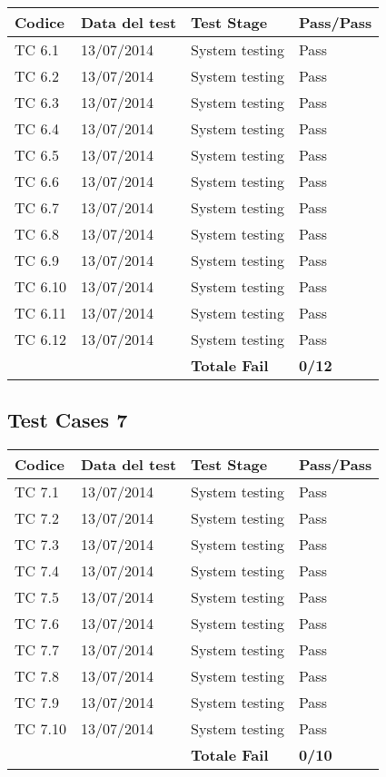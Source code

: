 \begin{tabular}{|p{3cm}|p{3cm}|p{3cm}|p{3cm}|}
	\hline
	\rowcolor{Gray}
	\textbf{Codice} & \textbf{Data del test} & \textbf{Test Stage} & \textbf{Pass/Pass}\tabularnewline
	\hline
	TC 6.1			& 13/07/2014 			& System testing		& Pass \tabularnewline
	\hline
	TC 6.2			& 13/07/2014 			& System testing		& Pass \tabularnewline
	\hline
	TC 6.3			& 13/07/2014 			& System testing		& Pass \tabularnewline
	\hline
	TC 6.4			& 13/07/2014 			& System testing		& Pass \tabularnewline
	\hline
	TC 6.5			& 13/07/2014 			& System testing		& Pass \tabularnewline
	\hline
	TC 6.6			& 13/07/2014 			& System testing		& Pass \tabularnewline
	\hline
	TC 6.7			& 13/07/2014 			& System testing		& Pass \tabularnewline
	\hline
	TC 6.8			& 13/07/2014 			& System testing		& Pass \tabularnewline
	\hline
	TC 6.9			& 13/07/2014 			& System testing		& Pass \tabularnewline
	\hline
	TC 6.10			& 13/07/2014 			& System testing		& Pass \tabularnewline
	\hline
	TC 6.11			& 13/07/2014 			& System testing		& Pass \tabularnewline
	\hline
	TC 6.12			& 13/07/2014 			& System testing		& Pass \tabularnewline
	\hline
					& 						& \textbf{Totale Fail}	& \textbf{0/12} \tabularnewline
	\hline
\end{tabular}

\subsection{Test Cases 7}

\begin{tabular}{|p{3cm}|p{3cm}|p{3cm}|p{3cm}|}
	\hline
	\rowcolor{Gray}
	\textbf{Codice} & \textbf{Data del test} & \textbf{Test Stage} & \textbf{Pass/Pass}\tabularnewline
	\hline
	TC 7.1			& 13/07/2014 			& System testing		& Pass \tabularnewline
	\hline
	TC 7.2			& 13/07/2014 			& System testing		& Pass \tabularnewline
	\hline
	TC 7.3			& 13/07/2014 			& System testing		& Pass \tabularnewline
	\hline
	TC 7.4			& 13/07/2014 			& System testing		& Pass \tabularnewline
	\hline
	TC 7.5			& 13/07/2014 			& System testing		& Pass \tabularnewline
	\hline
	TC 7.6			& 13/07/2014 			& System testing		& Pass \tabularnewline
	\hline
	TC 7.7			& 13/07/2014 			& System testing		& Pass \tabularnewline
	\hline
	TC 7.8			& 13/07/2014 			& System testing		& Pass \tabularnewline
	\hline
	TC 7.9			& 13/07/2014 			& System testing		& Pass \tabularnewline
	\hline
	TC 7.10			& 13/07/2014 			& System testing		& Pass \tabularnewline
	\hline
					& 						& \textbf{Totale Fail}	& \textbf{0/10} \tabularnewline
	\hline
\end{tabular}


